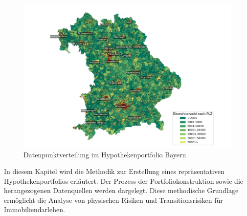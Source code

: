 \begin{figure}[htbp]
    \centering
    \includegraphics[width=\textwidth]{figures/bayern_por_pop.png} 
    \caption{Datenpunktverteilung im Hypothekenportfolio Bayern}
    \label{fig:hypothekenportfolio}
\end{figure}
\clearpage
In diesem Kapitel wird die Methodik zur Erstellung eines repräsentativen Hypothekenportfolios erläutert. Der Prozess der Portfoliokonstruktion sowie die herangezogenen Datenquellen werden dargelegt. Diese methodische Grundlage ermöglicht die Analyse von physischen Risiken und Transitionsrisiken für Immobiliendarlehen.



